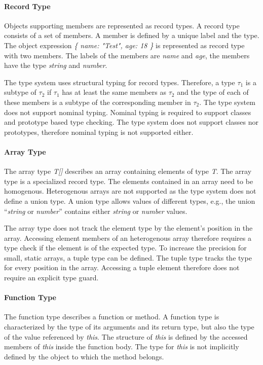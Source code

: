 \paragraph{Record Type}
Objects supporting members are represented as record types. A record type consists of a set of members. A member is defined by a unique label and the type. The object expression \textit{\{ name: "Test", age: 18 \}} is represented as record type with two members. The labels of the members are \textit{name} and \textit{age}, the members have the type \textit{string} and \textit{number}.  

The type system uses structural typing for record types. Therefore, a type $\tau_1$ is a subtype of $\tau_2$ if $\tau_1$ has at least the same members as $\tau_2$ and the type of each of these members is a subtype of the corresponding member in $\tau_2$. The type system does not support nominal typing. Nominal typing is required to support classes  and prototype based type checking. The type system does not support classes nor prototypes, therefore nominal typing is not supported either. 

\paragraph{Array Type}
The array type \textit{T[]} describes an array containing elements of type \textit{T}. The array type is a specialized record type. The elements contained in an array need to be homogenous. Heterogenous arrays are not supported as the type system does not define a union type. A union type allows values of different types, e.g., the union \enquote{\textit{string} or \textit{number}} contains either \textit{string} or \textit{number} values. 

The array type does not track the element type by the element's position in the array. Accessing element members of an heterogenous array therefore requires a type check if the element is of the expected type. To increase the precision for small, static arrays, a tuple type can be defined. The tuple type tracks the type for every position in the array. Accessing a tuple element therefore does not require an explicit type guard. 

\paragraph{Function Type}
The function type describes a function or method. A function type is characterized by the type of its arguments and its return type, but also the type of the value referenced by \textit{this}. The structure of \textit{this} is defined by the accessed members of \textit{this} inside the function body. The type for \textit{this} is not implicitly defined by the object to which the method belongs. 

